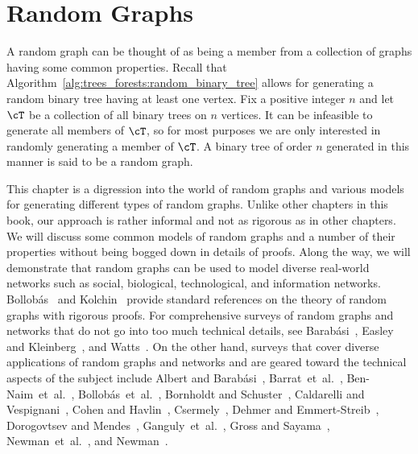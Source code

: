 
\chapter{Random Graphs}
\label{chap:random_graphs}

A random graph can be thought of as being a member
from a collection of graphs having some common properties. Recall that
Algorithm~\ref{alg:trees_forests:random_binary_tree} allows for
generating a random binary tree having at least one vertex. Fix a
positive integer $n$ and let $\cT$ be a collection of all binary trees
on $n$ vertices. It can be infeasible to generate all members of
$\cT$, so for most purposes we are only interested in randomly
generating a member of $\cT$. A binary tree of order $n$ generated in
this manner is said to be a random graph.

This chapter is a digression into the world of random graphs and
various models for generating different types of random graphs. Unlike
other chapters in this book, our approach is rather informal and not
as rigorous as in other chapters. We will discuss some common models
of random graphs and a number of their properties without being bogged
down in details of proofs. Along the way, we will demonstrate that
random graphs can be used to model diverse real-world networks such as
social, biological, technological, and information
networks. Bollob\'as~\cite{Bollobas2001} and Kolchin~\cite{Kolchin1999}
provide standard references on the theory of random graphs with
rigorous proofs. For comprehensive surveys of random graphs and
networks that do not go into too much technical details, see
Barab\'asi~\cite{Barabasi2002}, Easley and
Kleinberg~\cite{EasleyKleinberg2010}, and
Watts~\cite{Watts1999b,Watts2004}. On the other hand, surveys that
cover diverse applications of random graphs and networks and are
geared toward the technical aspects of the subject include Albert and
Barab\'asi~\cite{AlbertBarabasi2002},
Barrat~et~al.~\cite{BarratEtAl2008},
Ben-Naim~et~al.~\cite{Ben-NaimEtAl2004},
Bollob\'as~et~al.~\cite{BollobasEtAl2008}, Bornholdt and
Schuster~\cite{BornholdtSchuster2003}, Caldarelli and
Vespignani~\cite{CaldarelliVespignani2007}, Cohen and
Havlin~\cite{CohenHavlin2010}, Csermely~\cite{Csermely2009}, Dehmer
and Emmert-Streib~\cite{DehmerEmmert-Streib2009}, Dorogovtsev and
Mendes~\cite{DorogovtsevMendes2002a,DorogovtsevMendes2002b},
Ganguly~et~al.~\cite{GangulyEtAl2009}, Gross and
Sayama~\cite{GrossSayama2009}, Newman~et~al.~\cite{NewmanEtAl2006},
and Newman~\cite{Newman2003b,Newman2010}.

